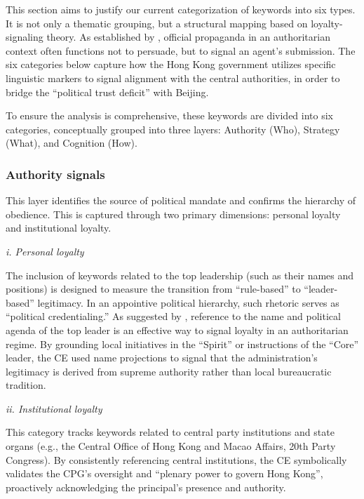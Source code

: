 \documentclass[9pt,a4paper,twocolumn,twoside]{rho-class/rho}
\begin{document}
        This section aims to justify our current categorization of keywords into six types. It is not only a thematic grouping, but a structural mapping based on 
        loyalty-signaling theory. As established by \textcite{huang2015propaganda}, official propaganda in an authoritarian context often functions not to persuade, but to signal 
        an agent's submission. The six categories below capture how the Hong Kong government utilizes specific linguistic markers to signal alignment with the central authorities, 
        in order to bridge the ``political trust deficit'' with Beijing.

        To ensure the analysis is comprehensive, these keywords are divided into six categories, conceptually grouped into three layers: Authority (Who), Strategy (What), and 
        Cognition (How).

        \subsubsection{Authority signals}
            
            This layer identifies the source of political mandate and confirms the hierarchy of obedience. This is captured through two primary dimensions: personal loyalty and 
            institutional loyalty.

            \textit{i. Personal loyalty}

            The inclusion of keywords related to the top leadership (such as their names and positions) is designed to measure the transition from ``rule-based'' to ``leader-based'' 
            legitimacy. In an appointive political hierarchy, such rhetoric serves as ``political credentialing.'' As suggested by \textcite{baturo2025playing}, reference to the name and political 
            agenda of the top leader is an effective way to signal loyalty in an authoritarian regime. By grounding local initiatives in the ``Spirit'' or instructions of the ``Core'' 
            leader, the CE used name projections to signal that the administration's legitimacy is derived from supreme authority rather than local bureaucratic tradition.

            \textit{ii. Institutional loyalty}

            This category tracks keywords related to central party institutions and state organs (e.g., the Central Office of Hong Kong and Macao Affairs, 20th Party Congress). By consistently referencing central institutions, 
            the CE symbolically validates the CPG's oversight and ``plenary power to govern Hong Kong'', proactively acknowledging the principal's presence and authority. 
            
\end{document}
